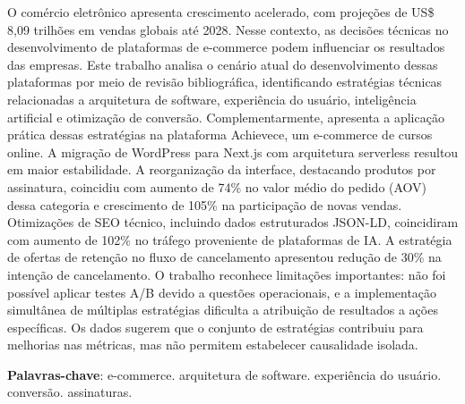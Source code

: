 \documentclass[
	12pt,				%
	twoside,			%
	a4paper,			%
	english,			%
	french,				%
	spanish,			%
	brazil				%
	]{abntex2}
\begin{document}
\setlength{\absparsep}{18pt} %
\begin{resumo}
O comércio eletrônico apresenta crescimento acelerado, com projeções de US\$ 8,09 trilhões em vendas globais até 2028. Nesse contexto, as decisões técnicas no desenvolvimento de plataformas de e-commerce podem influenciar os resultados das empresas. Este trabalho analisa o cenário atual do desenvolvimento dessas plataformas por meio de revisão bibliográfica, identificando estratégias técnicas relacionadas a arquitetura de software, experiência do usuário, inteligência artificial e otimização de conversão. Complementarmente, apresenta a aplicação prática dessas estratégias na plataforma Achievece, um e-commerce de cursos online. A migração de WordPress para Next.js com arquitetura serverless resultou em maior estabilidade. A reorganização da interface, destacando produtos por assinatura, coincidiu com aumento de 74\% no valor médio do pedido (AOV) dessa categoria e crescimento de 105\% na participação de novas vendas. Otimizações de SEO técnico, incluindo dados estruturados JSON-LD, coincidiram com aumento de 102\% no tráfego proveniente de plataformas de IA. A estratégia de ofertas de retenção no fluxo de cancelamento apresentou redução de 30\% na intenção de cancelamento. O trabalho reconhece limitações importantes: não foi possível aplicar testes A/B devido a questões operacionais, e a implementação simultânea de múltiplas estratégias dificulta a atribuição de resultados a ações específicas. Os dados sugerem que o conjunto de estratégias contribuiu para melhorias nas métricas, mas não permitem estabelecer causalidade isolada.

 \textbf{Palavras-chave}: e-commerce. arquitetura de software. experiência do usuário. conversão. assinaturas.
\end{resumo}
\end{document}
